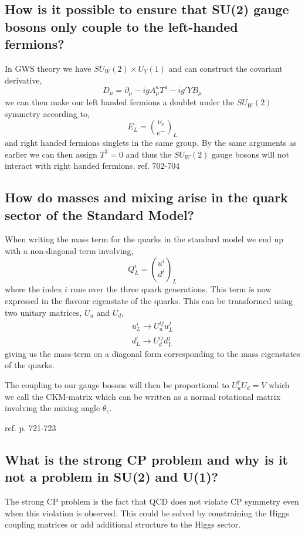 \documentclass[paper=a4, fontsize=11pt]{scrartcl} %
\numberwithin{equation}{section} %
\numberwithin{figure}{section} %
\numberwithin{table}{section} %
\begin{document}
\subsection*{How is it possible to ensure that SU(2) gauge bosons only couple to the left-handed fermions?}
In GWS theory we have $SU_W(2) \times U_Y(1)$ and can construct the covariant derivative, 
\begin{equation}
D_{\mu} = \partial_{\mu} - igA_{\mu}^aT^a-ig'YB_{\mu}
\end{equation}
we can then make our left handed fermions a doublet under the $SU_W(2)$ symmetry according to,
\begin{equation}
E_L = {\nu_e \choose e^-}_L
\end{equation}
and right handed fermions singlets in the same group. By the same arguments as earlier we can then assign $T^3 = 0$ and thus the $SU_W(2)$ gauge bosons will not interact with right handed fermions.
ref. 702-704




\subsection*{How do masses and mixing arise in the quark sector of the Standard Model?}
When writing the mass term for the quarks in the standard model we end up with a non-diagonal term involving,
\begin{equation}
Q^i_L = {u^i \choose d^i}_L
\end{equation}
where the index $i$ runs over the three quark generations. This term is now expressed in the flavour eigenstate of the quarks. This can be transformed using two unitary matrices, $U_u$ and $U_d$,
\begin{equation}
\begin{split}
u^i_L \rightarrow U^{ij}_u u^j_L \\
d^i_L \rightarrow U^{ij}_d d^j_L
\end{split}
\end{equation}
giving us the mass-term on a diagonal form corresponding to the mass eigenstates of the quarks. 

The coupling to our gauge bosons will then be proportional to $U_u^{\dagger}U_d = V$ which we call the CKM-matrix which can be written as a normal rotational matrix involving the mixing angle $\theta_c$.

ref. p. 721-723

\subsection*{What is the strong CP problem and why is it not a problem in SU(2) and U(1)?}
The strong CP problem is the fact that QCD does not violate CP symmetry even when this violation is observed. This could be solved by constraining the Higgs coupling matrices or add additional structure to the Higgs sector. 
\end{document}
